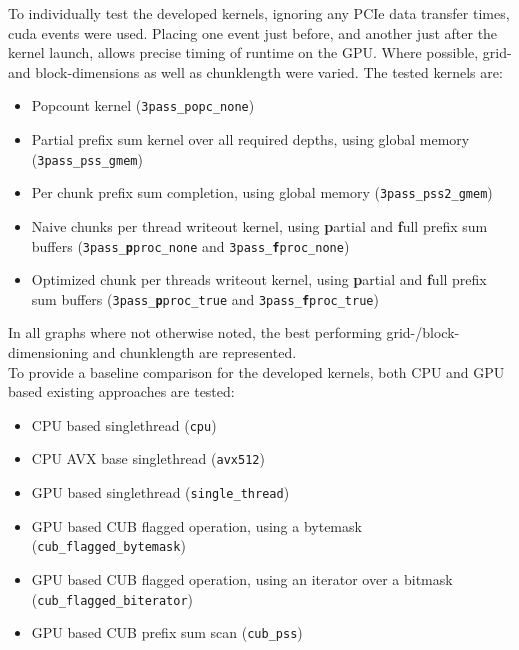 \documentclass{tudscrreprt}
\begin{document}
			To individually test the developed kernels, ignoring any PCIe data transfer times, cuda events were used. Placing one event just before, and another just after the kernel launch, allows precise timing of runtime on the GPU. Where possible, grid- and block-dimensions as well as chunklength were varied. The tested kernels are:\\
			\begin{itemize}
				\item Popcount kernel (\texttt{3pass\_popc\_none})
				\item Partial prefix sum kernel over all required depths, using global memory (\texttt{3pass\_pss\_gmem})
				\item Per chunk prefix sum completion, using global memory (\texttt{3pass\_pss2\_gmem})
				\item Naive chunks per thread writeout kernel, using \textbf{p}artial and \textbf{f}ull prefix sum buffers (\texttt{3pass\_\textbf{p}proc\_none} and \texttt{3pass\_\textbf{f}proc\_none})
				\item Optimized chunk per threads writeout kernel, using \textbf{p}artial and \textbf{f}ull prefix sum buffers (\texttt{3pass\_\textbf{p}proc\_true} and \texttt{3pass\_\textbf{f}proc\_true})
			\end{itemize}
			In all graphs where not otherwise noted, the best performing grid-/block-dimensioning and chunklength are represented. \\
			
			To provide a baseline comparison for the developed kernels, both CPU and GPU based existing approaches are tested:
			\begin{itemize}
				\item CPU based singlethread (\texttt{cpu})
				\item CPU AVX base singlethread (\texttt{avx512})
				\item GPU based singlethread (\texttt{single\_thread})
				\item GPU based CUB flagged operation, using a bytemask (\texttt{cub\_flagged\_bytemask})
				\item GPU based CUB flagged operation, using an iterator over a bitmask (\texttt{cub\_flagged\_biterator})
				\item GPU based CUB prefix sum scan (\texttt{cub\_pss})
			\end{itemize}
			
\end{document}
